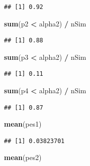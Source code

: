 \documentclass[]{book}
\newenvironment{Shaded}{\begin{snugshade}}{\end{snugshade}}
\newcommand{\KeywordTok}[1]{\textcolor[rgb]{0.13,0.29,0.53}{\textbf{#1}}}
\newcommand{\NormalTok}[1]{#1}
\newcommand{\OperatorTok}[1]{\textcolor[rgb]{0.81,0.36,0.00}{\textbf{#1}}}
\newcommand{\StringTok}[1]{\textcolor[rgb]{0.31,0.60,0.02}{#1}}
\begin{document}
\begin{verbatim}
## [1] 0.92
\end{verbatim}

\begin{Shaded}
\begin{Highlighting}[]
\KeywordTok{sum}\NormalTok{(p2 }\OperatorTok{<}\StringTok{ }\NormalTok{alpha2) }\OperatorTok{/}\StringTok{ }\NormalTok{nSim}
\end{Highlighting}
\end{Shaded}

\begin{verbatim}
## [1] 0.88
\end{verbatim}

\begin{Shaded}
\begin{Highlighting}[]
\KeywordTok{sum}\NormalTok{(p3 }\OperatorTok{<}\StringTok{ }\NormalTok{alpha2) }\OperatorTok{/}\StringTok{ }\NormalTok{nSim}
\end{Highlighting}
\end{Shaded}

\begin{verbatim}
## [1] 0.11
\end{verbatim}

\begin{Shaded}
\begin{Highlighting}[]
\KeywordTok{sum}\NormalTok{(p4 }\OperatorTok{<}\StringTok{ }\NormalTok{alpha2) }\OperatorTok{/}\StringTok{ }\NormalTok{nSim}
\end{Highlighting}
\end{Shaded}

\begin{verbatim}
## [1] 0.87
\end{verbatim}

\begin{Shaded}
\begin{Highlighting}[]
\KeywordTok{mean}\NormalTok{(pes1)}
\end{Highlighting}
\end{Shaded}

\begin{verbatim}
## [1] 0.03823701
\end{verbatim}

\begin{Shaded}
\begin{Highlighting}[]
\KeywordTok{mean}\NormalTok{(pes2)}
\end{Highlighting}
\end{Shaded}
\end{document}

